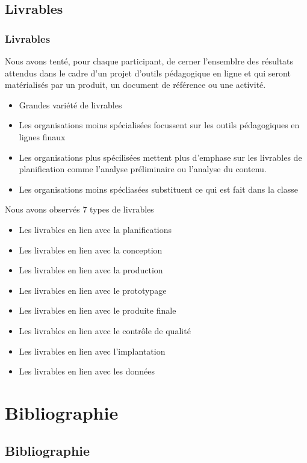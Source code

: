 						
						 \subsection{Livrables} 
						\begin{frame}[allowframebreaks]
						\frametitle{Livrables}
                        			Nous avons tenté, pour chaque participant, de cerner l’ensemblre des résultats attendus dans le cadre d’un projet d’outils pédagogique en ligne et qui seront matérialisés par un produit, un document de référence ou une activité.
						\begin{itemize}
							\item Grandes variété de livrables
							\item Les organisations moins spécialisées focussent sur les outils pédagogiques en lignes finaux
							\item Les organisations plus spécilisées mettent plus d'emphase sur les livrables de planification comme l'analyse préliminaire ou l'analyse du contenu.
							\item Les organisations moins spécliasées substituent ce qui est fait dans la classe
						\end{itemize}		
						Nous avons observés 7 types de livrables
						\begin{itemize}
							\item Les livrables en lien avec la planifications
							
							\item Les livrables en lien avec la conception
							\item Les livrables en lien avec la production
							\item Les livrables en lien avec le prototypage
							\item Les livrables en lien avec le produite finale
							\item Les livrables en lien avec le contrôle de qualité
							\item Les livrables en lien avec l'implantation
							\item Les livrables en lien avec les données
						\end{itemize}
						
					\end{frame}


\section{Bibliographie}
\subsection{Bibliographie}


